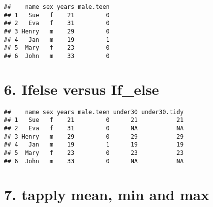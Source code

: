 \documentclass[]{article}
\newenvironment{Shaded}{\begin{snugshade}}{\end{snugshade}}
\newcommand{\CommentTok}[1]{\textcolor[rgb]{0.56,0.35,0.01}{\textit{#1}}}
\newcommand{\ControlFlowTok}[1]{\textcolor[rgb]{0.13,0.29,0.53}{\textbf{#1}}}
\newcommand{\DataTypeTok}[1]{\textcolor[rgb]{0.13,0.29,0.53}{#1}}
\newcommand{\DecValTok}[1]{\textcolor[rgb]{0.00,0.00,0.81}{#1}}
\newcommand{\KeywordTok}[1]{\textcolor[rgb]{0.13,0.29,0.53}{\textbf{#1}}}
\newcommand{\NormalTok}[1]{#1}
\newcommand{\OperatorTok}[1]{\textcolor[rgb]{0.81,0.36,0.00}{\textbf{#1}}}
\newcommand{\OtherTok}[1]{\textcolor[rgb]{0.56,0.35,0.01}{#1}}
\newcommand{\StringTok}[1]{\textcolor[rgb]{0.31,0.60,0.02}{#1}}
\begin{document}
\begin{verbatim}
##    name sex years male.teen
## 1   Sue   f    21         0
## 2   Eva   f    31         0
## 3 Henry   m    29         0
## 4   Jan   m    19         1
## 5  Mary   f    23         0
## 6  John   m    33         0
\end{verbatim}

\hypertarget{ifelse-versus-if_else}{%
\section{6. Ifelse versus If\_else}\label{ifelse-versus-if_else}}

\begin{Shaded}
\end{Shaded}

\begin{verbatim}
##    name sex years male.teen under30 under30.tidy
## 1   Sue   f    21         0      21           21
## 2   Eva   f    31         0      NA           NA
## 3 Henry   m    29         0      29           29
## 4   Jan   m    19         1      19           19
## 5  Mary   f    23         0      23           23
## 6  John   m    33         0      NA           NA
\end{verbatim}

\hypertarget{tapply-mean-min-and-max}{%
\section{7. tapply mean, min and max}\label{tapply-mean-min-and-max}}

\begin{Shaded}
\end{Shaded}
\end{document}
